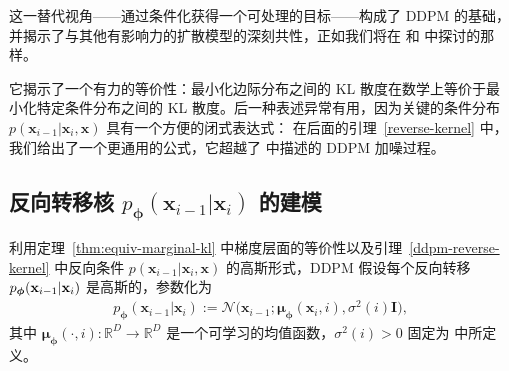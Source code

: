 这一替代视角——通过条件化获得一个可处理的目标——构成了 DDPM 的基础，并揭示了与其他有影响力的扩散模型的深刻共性，正如我们将在  和  中探讨的那样。


它揭示了一个有力的等价性：最小化边际分布之间的 KL 散度在数学上等价于最小化特定条件分布之间的 KL 散度。后一种表述异常有用，因为关键的条件分布 $p(\mathbf{x}_{i-1}|\mathbf{x}_i, \mathbf{x})$ 具有一个方便的闭式表达式：
在后面的引理~\ref{reverse-kernel} 中，我们给出了一个更通用的公式，它超越了  中描述的 DDPM 加噪过程。


\subsection{反向转移核 $p_{\bm{\phi}}(\mathbf{x}_{i-1}|\mathbf{x}_i)$ 的建模} 利用定理~\ref{thm:equiv-marginal-kl} 中梯度层面的等价性以及引理~\ref{ddpm-reverse-kernel} 中反向条件 $p(\mathbf{x}_{i-1}|\mathbf{x}_i, \mathbf{x})$ 的高斯形式，DDPM 假设每个反向转移 $p_{\bm{\phi}}({\mathbf{x}}_{i-1}| {\mathbf{x}}_i)$ 是高斯的，参数化为
\begin{align}\label{eq:def-reverse}
    p_{\bm{\phi}}(\mathbf{x}_{i-1}|\mathbf{x}_i) := \mathcal{N}\big(\mathbf{x}_{i-1}; \bm{\mu}_{\bm{\phi}}(\mathbf{x}_i, i), \sigma^2(i) \mathbf{I}\big),
\end{align}
其中 $\bm{\mu}_{\bm{\phi}}(\cdot, i) \colon \mathbb{R}^D \to \mathbb{R}^D$ 是一个可学习的均值函数，$\sigma^2(i) > 0$ 固定为  中所定义。

